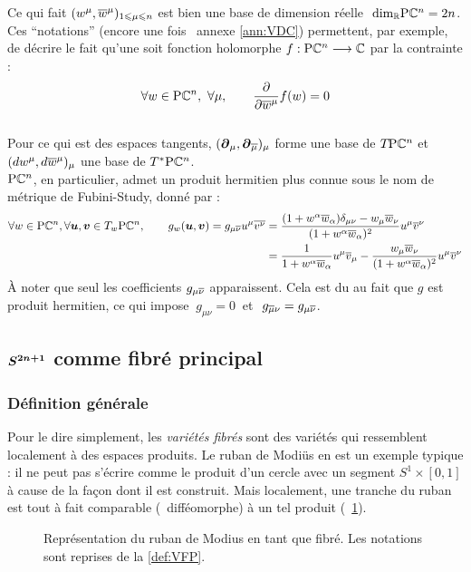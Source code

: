 Ce qui fait $(w^\mu, \congu{w}^\mu)_{1\leq \mu \leq n}$ est bien une base de dimension réelle $\ \dim[\R]\PC{n} = 2n$. Ces ``notations'' (encore une fois \cf~annexe \ref{ann:VDC}) permettent, par exemple, de décrire le fait qu'une soit fonction holomorphe $f: \PC{n}\lr \C$ par la contrainte :
\[\forall w\in\PC{n},\ \forall \mu,\qquad \frac{\partial}{\partial \congu{w}^\mu}f(w) = 0\] 
\\
Pour ce qui est des espaces tangents, $(\bt_\mu, \bt_{\congu{\mu}})_\mu$ forme une base de $\tg{\PC{n}}$ et $(dw^\mu, d\congu{w}^\mu)_\mu$ une base de $\tg{^* \PC{n}}$.
\\
$\PC{n}$, en particulier, admet un produit hermitien plus connue sous le nom de métrique de Fubini-Study, donné par :
\begin{equation}
	\begin{aligned}
		\forall w\in\PC{n}, \forall \bf{u},\bf{v}\in\tg[w]{\PC{n}},\qquad g_w(\bf{u}, \bf{v}) = g_{\mu\congu{\nu}} u^\mu \congu{v^\nu} 
		&= \frac{(1+w^\alpha \congu{w}_\alpha)\delta_{\mu\nu} - w_\mu \congu{w}_\nu}{(1+w^\alpha \congu{w}_\alpha)^2}u^\mu \congu{v}^\nu \\
		&= \frac{1}{1+w^\alpha \congu{w}_\alpha} u^\mu \congu{v}_\mu - \frac{w_\mu \congu{w}_\nu}{(1+w^\alpha \congu{w}_\alpha)^2} u^\mu \congu{v}^\nu
	\end{aligned}
\end{equation}
À noter que seul les coefficients $g_{\mu \congu{\nu}}$ apparaissent. Cela est du au fait que $g$ est produit hermitien, ce qui impose $\ g_{\mu\nu} = 0\ $ et $\ g_{\congu{\mu} \nu} = g_{\mu \congu{\nu}}$.





\subsection{$\bf{S^{2n+1}}$ comme fibré principal} \label{subsec:VFP}

\subsubsection{Définition générale}\label{subsec:def2VFP}

Pour le dire simplement, les \emph{variétés fibrés} sont des variétés qui ressemblent localement à des espaces produits. 
Le ruban de Modiüs en est un exemple typique : il ne peut pas s'écrire comme le produit d'un cercle avec un segment $S^{1}\times [0,1]$ à cause de la façon dont il est construit. Mais localement, une tranche du ruban est tout à fait comparable (\ie~difféomorphe) à un tel produit (\cf~\cref{fig:ruban2modius}).
\begin{figure}[h]
	
	\caption[Ruban de Mobius comme variété fibrée]{Représentation du ruban de Modius en tant que fibré. Les notations sont reprises de la \cref{def:VFP}.}
	\label{fig:ruban2modius}
\end{figure}
\skipl

